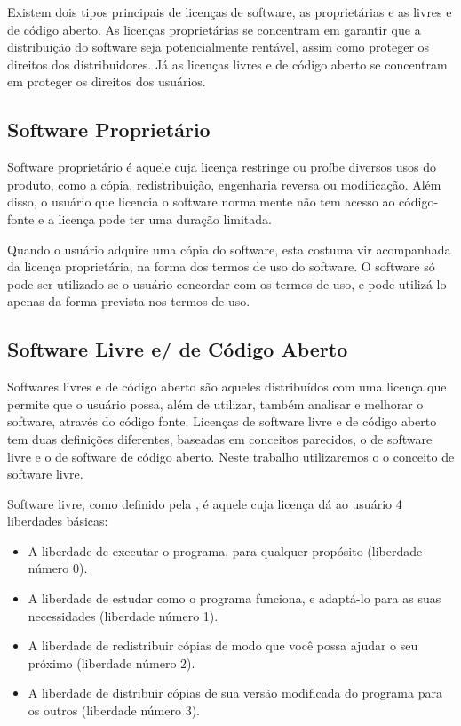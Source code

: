 Existem dois tipos principais de licenças de software, as proprietárias e as livres e de código aberto. As licenças proprietárias se concentram em garantir que a distribuição do software seja potencialmente rentável, assim como proteger os direitos dos distribuidores. Já as licenças livres e de código aberto se concentram em proteger os direitos dos usuários.

\subsection{Software Proprietário} 

Software proprietário é aquele cuja licença restringe ou proíbe diversos usos do produto, como a cópia, redistribuição, engenharia reversa ou modificação. Além disso, o usuário que licencia o software normalmente não tem acesso ao código-fonte e a licença pode ter uma duração limitada.

Quando o usuário adquire uma cópia do software, esta costuma vir acompanhada da licença proprietária, na forma dos termos de uso do software. O software só pode ser utilizado se o usuário concordar com os termos de uso, e pode utilizá-lo apenas da forma prevista nos termos de uso.

\subsection{Software Livre e/ de Código Aberto}

Softwares livres e de código aberto são aqueles distribuídos com uma licença que permite que o usuário possa, além de utilizar, também analisar e melhorar o software, através do código fonte. Licenças de software livre e de código aberto tem duas definições diferentes, baseadas em conceitos parecidos, o de software livre e o de software de código aberto. Neste trabalho utilizaremos o o conceito de software livre.

Software livre, como definido pela , é aquele cuja licença dá ao usuário 4 liberdades básicas\cite{GNUFreeSoftware}:

\begin{itemize}

\item A liberdade de executar o programa, para qualquer propósito (liberdade número 0).
\item A liberdade de estudar como o programa funciona, e adaptá-lo para as suas necessidades (liberdade número 1).
\item A liberdade de redistribuir cópias de modo que você possa ajudar o seu próximo (liberdade número 2).
\item A liberdade de distribuir cópias de sua versão modificada do programa para os outros (liberdade número 3).

\end{itemize}

